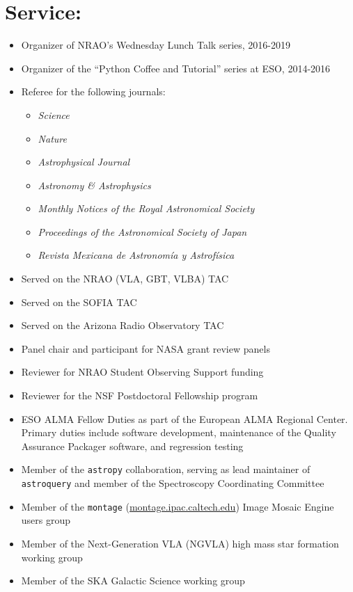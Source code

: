 
\section*{Service:}
\vspace{-10pt}
\begin{itemize}
\itemsep-3pt
        
    \item Organizer of NRAO's Wednesday Lunch Talk series, 2016-2019
    \item Organizer of the ``Python Coffee and Tutorial'' series at ESO, 2014-2016
    \item Referee for the following journals:
        \begin{itemize}
            \itemsep-3pt
            \item \textit{Science}
            \item \textit{Nature}
            \item \textit{Astrophysical Journal}
            \item \textit{Astronomy \& Astrophysics}
            \item \textit{Monthly Notices of the Royal Astronomical Society}
            \item \textit{Proceedings of the Astronomical Society of Japan}
            \item \textit{Revista Mexicana de Astronom{\'i}a y Astrof{\'i}sica}
    \end{itemize}
    \item Served on the NRAO (VLA, GBT, VLBA) TAC
    \item Served on the SOFIA TAC
    \item Served on the Arizona Radio Observatory TAC
    \item Panel chair and participant for NASA grant review panels
    \item Reviewer for NRAO Student Observing Support funding
    \item Reviewer for the NSF Postdoctoral Fellowship program
    \item ESO ALMA Fellow Duties as part of the European ALMA Regional Center.
        Primary duties include software development, maintenance of the
        Quality Assurance Packager software, and regression testing
    \item Member of the \texttt{astropy} collaboration, serving as lead maintainer
        of \texttt{astroquery} and member of the Spectroscopy Coordinating Committee
    \item Member of the \texttt{montage} (\url{montage.ipac.caltech.edu}) Image
        Mosaic Engine users group
    \item Member of the Next-Generation VLA (NGVLA) high mass star formation
        working group
    \item Member of the SKA Galactic Science
        working group
\end{itemize}
